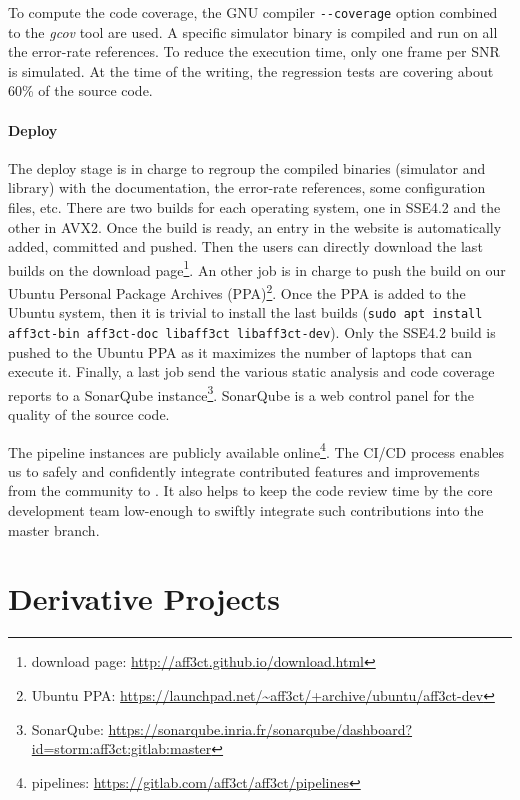 To compute the code coverage, the GNU compiler \verb|--coverage| option combined
to the \emph{gcov} tool are used. A specific \AFFECT simulator binary is
compiled and run on all the error-rate references. To reduce the execution time,
only one frame per SNR is simulated. At the time of the writing, the regression
tests are covering about 60\% of the \AFFECT source code.

\paragraph{Deploy}

The deploy stage is in charge to regroup the \AFFECT compiled binaries
(simulator and library) with the documentation, the error-rate references, some
configuration files, etc. There are two builds for each operating system, one in
SSE4.2 and the other in AVX2. Once the build is ready, an entry in the \AFFECT
website is automatically added, committed and pushed. Then the users can
directly download the last builds on the \AFFECT download page\footnote{\AFFECT
download page: \url{http://aff3ct.github.io/download.html}}. An other job is in
charge to push the \AFFECT build on our Ubuntu Personal Package Archives
(PPA)\footnote{\AFFECT Ubuntu PPA: \url{https://launchpad.net/~aff3ct/+archive/ubuntu/aff3ct-dev}}.
Once the \AFFECT PPA is added to the Ubuntu system, then it is trivial to
install the last \AFFECT builds
(\verb|sudo apt install aff3ct-bin aff3ct-doc libaff3ct libaff3ct-dev|). Only
the SSE4.2 build is pushed to the Ubuntu PPA as it maximizes the number of
laptops that can execute it. Finally, a last job send the various static
analysis and code coverage reports to a SonarQube instance\footnote{\AFFECT
SonarQube: \url{https://sonarqube.inria.fr/sonarqube/dashboard?id=storm:aff3ct:gitlab:master}}.
SonarQube is a web control panel for the quality of the source code.

The \AFFECT pipeline instances are publicly available online\footnote{\AFFECT
pipelines: \url{https://gitlab.com/aff3ct/aff3ct/pipelines}}. The CI/CD process
enables us to safely and confidently integrate contributed features and
improvements from the community to \AFFECT. It also helps to keep the code
review time by the core development team low-enough to swiftly integrate such
contributions into the master branch.

\section{Derivative Projects}

